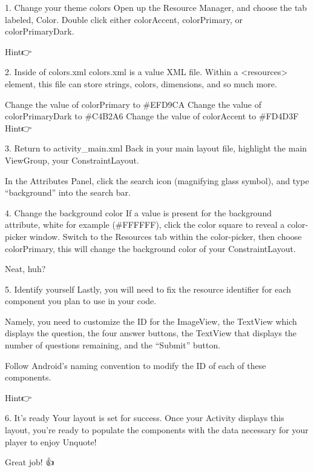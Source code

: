         1. Change your theme colors
        Open up the Resource Manager, and choose the tab labeled, Color. Double click either colorAccent, colorPrimary, or colorPrimaryDark.

        Hint👉

    2. Inside of colors.xml
        colors.xml is a value XML file. Within a <resources> element, this file can store strings, colors, dimensions, and so much more.

        Change the value of colorPrimary to #EFD9CA
        Change the value of colorPrimaryDark to #C4B2A6
        Change the value of colorAccent to #FD4D3F
        Hint👉

    3. Return to activity_main.xml
        Back in your main layout file, highlight the main ViewGroup, your ConstraintLayout.

        In the Attributes Panel, click the search icon (magnifying glass symbol), and type “background” into the search bar.

        4. Change the background color
        If a value is present for the background attribute, white for example (#FFFFFF), click the color square to reveal a color-picker window. Switch to the Resources tab within the color-picker, then choose colorPrimary, this will change the background color of your ConstraintLayout.

        Neat, huh?

        5. Identify yourself
        Lastly, you will need to fix the resource identifier for each component you plan to use in your code.

        Namely, you need to customize the ID for the ImageView, the TextView which displays the question, the four answer buttons, the TextView that displays the number of questions remaining, and the “Submit” button.

        Follow Android’s naming convention to modify the ID of each of these components.

        Hint👉

    6. It’s ready
        Your layout is set for success. Once your Activity displays this layout, you’re ready to populate the components with the data necessary for your player to enjoy Unquote!

        Great job! 👍